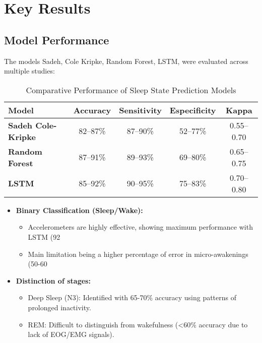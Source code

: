 \documentclass[conference]{IEEEtran}
\begin{document}
\section{Key Results}

\subsection{Model Performance}
    The models Sadeh, Cole Kripke, Random Forest, LSTM, were evaluated across multiple studies:
    
\begin{table}[h]
\centering
\small
\begin{tabular}{|p{0.9cm}|c|c|c|c|}
\hline
\textbf{Model} & \textbf{Accuracy} & \textbf{Sensitivity} & \textbf{Especificity} & \textbf{Kappa} \\
\hline
\textbf{Sadeh Cole-Kripke} & 82--87\% & 87--90\% & 52--77\% & 0.55--0.70 \\
\hline
\textbf{Random Forest} & 87--91\% & 89--93\% & 69--80\% & 0.65--0.75 \\
\hline
\textbf{LSTM} & 85--92\% & 90--95\% & 75--83\% & 0.70--0.80 \\
\hline
\end{tabular}
\caption{Comparative Performance of Sleep State Prediction Models}
\label{tab:modelos}
\end{table}

\begin{itemize}
	\item \textbf{Binary Classification (Sleep/Wake):}
	      \begin{itemize}
		      \item Accelerometers are highly effective, showing maximum performance with LSTM (92%
		      \item Main limitation being a higher percentage of error in micro-awakenings (50-60%
	      \end{itemize}
	\item \textbf{Distinction of stages:}
	      \begin{itemize}
		      \item Deep Sleep (N3): Identified with 65-70\% accuracy using patterns of prolonged inactivity.
		      \item REM: Difficult to distinguish from wakefulness (<60\% accuracy due to lack of EOG/EMG signals).
	      \end{itemize}
\end{itemize}
\end{document}
